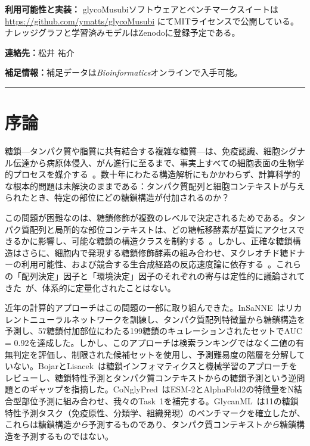 \documentclass[11pt,a4paper]{ltjsarticle}
\newcommand{\HRule}{\rule{\linewidth}{0.4pt}}
\begin{document}
\textbf{利用可能性と実装：}
glycoMusubiソフトウェアとベンチマークスイートは
\url{https://github.com/ymatts/glycoMusubi}
にてMITライセンスで公開している。ナレッジグラフと学習済みモデルはZenodoに登録予定である。

\textbf{連絡先：}松井 祐介

\textbf{補足情報：}補足データは\textit{Bioinformatics}オンラインで入手可能。

\HRule

\section{序論}

糖鎖---タンパク質や脂質に共有結合する複雑な糖質---は、免疫認識、細胞シグナル伝達から病原体侵入、がん進行に至るまで、事実上すべての細胞表面の生物学的プロセスを媒介する~\cite{varki2017,reily2019}。数十年にわたる構造解析にもかかわらず、計算科学的な根本的問題は未解決のままである：タンパク質配列と細胞コンテキストが与えられたとき、特定の部位にどの糖鎖構造が付加されるのか？

この問題が困難なのは、糖鎖修飾が複数のレベルで決定されるためである。タンパク質配列と局所的な部位コンテキストは、どの糖転移酵素が基質にアクセスできるかに影響し、可能な糖鎖の構造クラスを制約する~\cite{schjoldager2020,narimatsu2019}。しかし、正確な糖鎖構造はさらに、細胞内で発現する糖鎖修飾酵素の組み合わせ、ヌクレオチド糖ドナーの利用可能性、および競合する生合成経路の反応速度論に依存する~\cite{stanley2022,varki2022essentials}。これらの「配列決定」因子と「環境決定」因子のそれぞれの寄与は定性的に議論されてきた~\cite{schjoldager2020}が、体系的に定量化されたことはない。

近年の計算的アプローチはこの問題の一部に取り組んできた。InSaNNE~\cite{kellman2024}はリカレントニューラルネットワークを訓練し、タンパク質配列特徴量から糖鎖構造を予測し、57糖鎖付加部位にわたる199糖鎖のキュレーションされたセットでAUC = 0.92を達成した。しかし、このアプローチは検索ランキングではなく二値の有無判定を評価し、制限された候補セットを使用し、予測難易度の階層を分解していない。BojarとLisacek~\cite{bojar2022}は糖鎖インフォマティクスと機械学習のアプローチをレビューし、糖鎖特性予測とタンパク質コンテキストからの糖鎖予測という逆問題とのギャップを指摘した。CoNglyPred~\cite{congly2025}はESM-2とAlphaFold2の特徴量をN結合型部位予測に組み合わせ、我々のTask~1を補完する。GlycanML~\cite{glyml2024}は11の糖鎖特性予測タスク（免疫原性、分類学、組織発現）のベンチマークを確立したが、これらは糖鎖構造\textit{から}予測するものであり、タンパク質コンテキスト\textit{から}糖鎖構造を予測するものではない。
\end{document}
